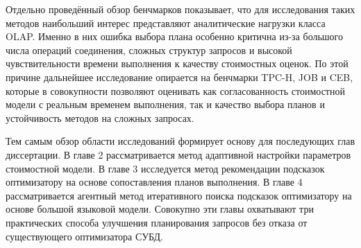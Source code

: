 Отдельно проведённый обзор бенчмарков показывает, что для исследования таких методов наибольший интерес представляют аналитические нагрузки класса OLAP. Именно в них ошибка выбора плана особенно критична из-за большого числа операций соединения, сложных структур запросов и высокой чувствительности времени выполнения к качеству стоимостных оценок. По этой причине дальнейшее исследование опирается на бенчмарки TPC-H, JOB и CEB, которые в совокупности позволяют оценивать как согласованность стоимостной модели с реальным временем выполнения, так и качество выбора планов и устойчивость методов на сложных запросах.

Тем самым обзор области исследований формирует основу для последующих глав диссертации. В главе 2 рассматривается метод адаптивной настройки параметров стоимостной модели. В главе 3 исследуется метод рекомендации подсказок оптимизатору на основе сопоставления планов выполнения. В главе 4 рассматривается агентный метод итеративного поиска подсказок оптимизатору на основе большой языковой модели. Совокупно эти главы охватывают три практических способа улучшения планирования запросов без отказа от существующего оптимизатора СУБД.

\FloatBarrier

